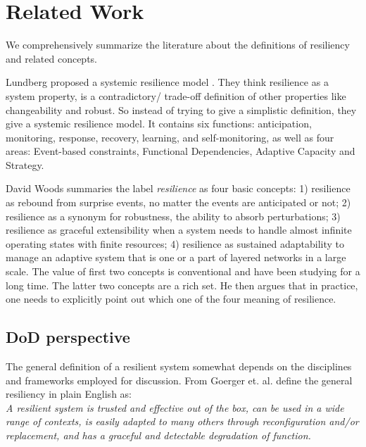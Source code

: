 \documentclass[11pt]{article}
\begin{document}
\section{Related Work}
We comprehensively summarize the literature about the definitions of resiliency and related concepts.

Lundberg proposed a systemic resilience model \cite{Lundberg2015}. They think resilience as a system property, is a contradictory/ trade-off definition of other properties like changeability and robust. So instead of trying to give a simplistic definition, they give a systemic resilience model. It contains six functions: anticipation, monitoring, response, recovery, learning, and self-monitoring, as well as four areas: Event-based constraints, Functional Dependencies, Adaptive Capacity and Strategy.

David Woods \cite{Woods2015} summaries the label \emph{resilience} as four basic concepts: 1) resilience as rebound from surprise events, no matter the events are anticipated or not; 2) resilience as a synonym for robustness, the ability to absorb perturbations; 3) resilience as graceful extensibility when a system needs to handle almost infinite operating states with finite resources; 4) resilience as sustained adaptability to manage an adaptive system that is one or a part of layered networks in a large scale. The value of first two concepts is conventional and have been studying for a long time. The latter two concepts are a rich set. He then argues that in practice, one needs to explicitly point out which one of the four meaning of resilience. 

\subsection{DoD perspective}
The general definition of a resilient system somewhat depends on the disciplines and frameworks employed for discussion. From Goerger et. al. \cite{Goerger2014} define the general resiliency in plain English as:\\

\emph{
A resilient system is trusted and effective out of the box, can be used in a wide range of contexts, is easily adapted to many others through reconfiguration and/or replacement, and has a graceful and detectable degradation of function.
}\\
\end{document}
